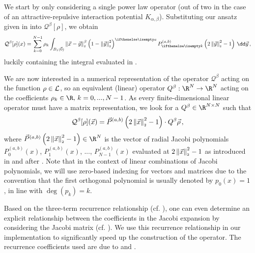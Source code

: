 We start by only considering a single power law operator (out of two in the case of an attractive-repulsive interaction potential $K_{\alpha, \beta}$).
Substituting our ansatz given in  into $\mathcal{Q}^\beta[\rho]$, we obtain
\begin{equation}
  \mathcal{Q}^{\beta}[\rho](x) = \sum_{k=0}^{N-1} \rho_{k} \int_{B_1(\vec{0})} \norm{\vec{x}-\vec{y}}^{\beta} \weight{y}\jacobi{y} \,\dd\vec{y}\,,
  \label{eq:theorem216-in-derivation}
\end{equation}
luckily containing the integral evaluated in .

We are now interested in a numerical representation of the operator $\mathcal{Q}^\beta$ acting on the function $\rho \in \mathcal{L}$, so an equivalent (linear) operator $Q^\beta: \R^N \to \R^N$ acting on the coefficients $\rho_k \in \R,\, k = 0, ..., N-1$.
As every finite-dimensional linear operator must have a matrix representation, we look for a $Q^\beta \in \R^{N \times N}$ such that
$$\mathcal{Q}^\beta[\rho](\vec{x}) = \vec{P}^{(a, b)}\left(2 \left\lVert\vec{x}\right\rVert_{\scriptscriptstyle 2}^2 - 1\right) \cdot Q^\beta \vec{\rho}\,,$$
where $\jacobivec{x} \in \R^N$ is the vector of radial Jacobi polynomials $P^{(a, b)}_0(x)$, $P^{(a, b)}_1(x)$, ..., $P^{(a, b)}_{N-1}(x)$ evaluated at $2\left\lVert\vec{x}\right\rVert_{\scriptscriptstyle 2}^2 - 1$ as introduced in and after .
Note that in the context of linear combinations of Jacobi polynomials, we will use zero-based indexing for vectors and matrices due to the convention that the first orthogonal polynomial is usually denoted by $p_0(x) = 1$, in line with $\deg(p_k) = k$.

Based on the three-term recurrence relationship (cf. ), one can even determine an explicit relationship between the coefficients in the Jacobi expansion by considering the Jacobi matrix (cf. ).
We use this recurrence relationship in our implementation to significantly speed up the construction of the operator.
The recurrence coefficients used are due to \cite{2021-arbitrary-dimensions} and \cite{2023-olver-equilibrium-measures-jl}.

